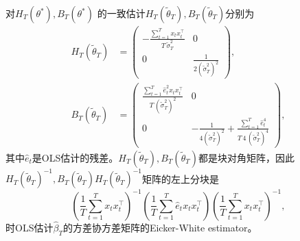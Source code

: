 对$H_{T} \left( \theta^{*} \right), B_{T} \left(\theta^{*} \right)$ 的一致估计$H_{T}\left( \tilde{\theta}_{T} \right), B_{T} \left(\tilde{\theta}_{T} \right)$分别为
\begin{equation*}
    \begin{split}
        H_{T}\left( \tilde{\theta}_{T} \right)
        & = \begin{pmatrix}
        - \frac{
        \sum_{t=1}^{T} x_{t} x_{t}^{\top}
        }{
        T \, \tilde{\sigma}_{T}^{2}
        } & 0 \\
        0 & \frac{1}{2 \left( \tilde{\sigma}_{T}^{2} \right)^{2}}
        \end{pmatrix}, \\
        B_{T} \left(\tilde{\theta}_{T} \right)
        & = \begin{pmatrix}
        \frac{
        \sum_{t=1}^{T} \hat{e}_{t}^{2} x_{t} x_{t}^{\top}
        }{
        T \, \left( \tilde{\sigma}_{T}^{2} \right)^{2}
        } & 0 \\
        0 &
        - \frac{1}{4 \left( \tilde{\sigma}_{T}^{2} \right)^{2}}
        + \frac{
        \sum_{t=1}^{T} \hat{e}_{t}^{4}
        }{
        T \, 4 \, \left( \tilde{\sigma}_{T}^{2} \right)^{4}
        }
        \end{pmatrix},
    \end{split}
\end{equation*}
其中$\hat{e}_{t}$是OLS估计的残差。$H_{T}\left( \tilde{\theta}_{T} \right), B_{T} \left(\tilde{\theta}_{T} \right)$都是块对角矩阵，因此$H_{T}\left( \tilde{\theta}_{T} \right)^{-1}, B_{T} \left(\tilde{\theta}_{T} \right) H_{T}\left( \tilde{\theta}_{T} \right)^{-1}$矩阵的左上分块是
\begin{equation*}
    \left( \frac{1}{T} \sum_{t=1}^{T} x_{t} x_{t}^{\top} \right)^{-1}
    \left( \frac{1}{T} \sum_{t=1}^{T} \hat{e}_{t} x_{t}x_{t}^{\top} \right)
    \left( \frac{1}{T} \sum_{t=1}^{T} x_{t} x_{t}^{\top} \right)^{-1},
\end{equation*}
时OLS估计$\hat{\beta}_{T}$的方差协方差矩阵的Eicker-White estimator。
